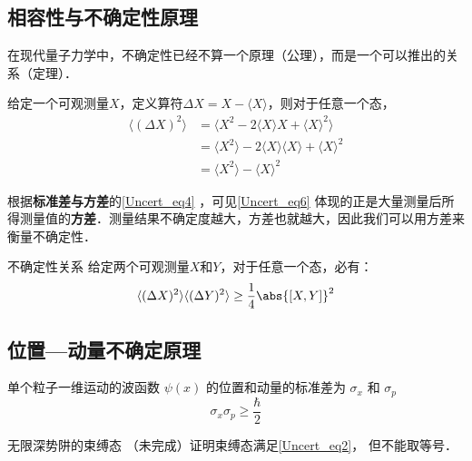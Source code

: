 


\subsection{相容性与不确定性原理}

在现代量子力学中，不确定性已经不算一个原理（公理），而是一个可以推出的关系（定理）．

给定一个可观测量$X$，定义算符$\Delta X=X-\langle X \rangle$，则对于任意一个态，
\begin{equation}\label{Uncert_eq6}
\begin{aligned}
\langle (\Delta X)^2 \rangle &= \langle X^2-2\langle X \rangle X + \langle X \rangle^2 \rangle\\
&=\langle X^2\rangle -2\langle X \rangle \langle X \rangle + \langle X \rangle^2\\
&=\langle X^2 \rangle - \langle X \rangle^2
\end{aligned}
\end{equation}

根据\textbf{标准差与方差}的\autoref{Uncert_eq4} ，可见\autoref{Uncert_eq6} 体现的正是大量测量后所得测量值的\textbf{方差}．测量结果不确定度越大，方差也就越大，因此我们可以用方差来衡量不确定性．

\begin{theorem}{不确定性关系}
给定两个可观测量$X$和$Y$，对于任意一个态，必有：
\begin{equation}
\langle (\Delta X)^2 \rangle\langle (\Delta Y)^2 \rangle \geq \frac{1}{4}\abs{[X, Y]}^2
\end{equation}
\end{theorem}







\subsection{位置—动量不确定原理}
单个粒子一维运动的波函数 $\psi(x)$ 的位置和动量的标准差为 $\sigma_x$ 和 $\sigma_p$
\begin{equation}\label{Uncert_eq2}
\sigma_x \sigma_p \geqslant \frac{\hbar}{2}
\end{equation}

\begin{example}{无限深势阱的束缚态}\label{Uncert_ex2}
（未完成）证明束缚态满足\autoref{Uncert_eq2}， 但不能取等号．
\end{example}


